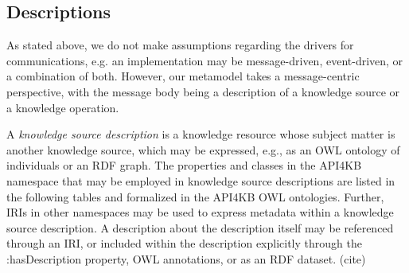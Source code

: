 \documentclass[runningheads]{llncs}
\begin{document}



\subsection{Descriptions}
As stated above, we do not make assumptions regarding the drivers for communications, e.g. an implementation may be message-driven, event-driven, or a combination of both. However, our metamodel takes a message-centric perspective, with the message body being a description of a knowledge source or a knowledge operation.

A \emph{knowledge source description} is a knowledge resource whose subject matter is another knowledge source, which may be expressed, e.g., as an OWL ontology of individuals or an RDF graph. The properties and classes in the API4KB namespace that may be employed in knowledge source descriptions are listed in the following tables and formalized in the API4KB OWL ontologies. Further, IRIs in other namespaces may be used to express metadata within a knowledge source description. A description about the description itself may be referenced through an IRI, or included within the description explicitly through the :hasDescription property,  OWL annotations, or as an RDF dataset. (cite)
\end{document}
